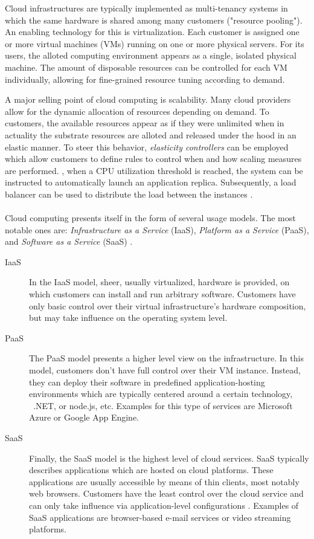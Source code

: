 Cloud infrastructures are typically implemented as multi-tenancy systems in which the same hardware is shared among many customers ("resource pooling"). An enabling technology for this is virtualization. Each customer is assigned one or more virtual machines (VMs) running on one or more physical servers. For its users, the alloted computing environment appears as a single, isolated physical machine. The amount of disposable resources can be controlled for each VM individually, allowing for fine-grained resource tuning according to demand.

A major selling point of cloud computing is scalability. Many cloud providers allow for the dynamic allocation of resources depending on demand. To customers, the available resources appear as if they were unlimited when in actuality the substrate resources are alloted and released under the hood in an elastic manner. To steer this behavior, \emph{elasticity controllers} can be employed which allow customers to define rules to control when and how scaling measures are performed. \Eg , when a CPU utilization threshold is reached, the system can be instructed to automatically launch an application replica. Subsequently, a load balancer can be used to distribute the load between the instances \cite{vaquero2011dynamically}.


\paragraph{}
Cloud computing presents itself in the form of several usage models. The most notable ones are: \emph{Infrastructure as a Service} (IaaS),  \emph{Platform as a Service} (PaaS),  and \emph{Software as a Service} (SaaS) \cite{mell2011nist}.

\begin{description}
\item[IaaS] In the IaaS model, sheer, usually virtualized, hardware is provided, on which customers can install and run arbitrary software. Customers have only basic control over their virtual infrastructure's hardware composition, but may take influence on the operating system level.
\item[PaaS] The PaaS model presents a higher level view on the infrastructure. In this model, customers don't have full control over their VM instance. Instead, they can deploy their software in predefined application-hosting environments \cite{mell2011nist} which are typically centered around a certain technology, \eg\ .NET, or node.js, etc. Examples for this type of services are Microsoft Azure or Google App Engine.
\item[SaaS] Finally, the SaaS model is the highest level of cloud services. SaaS typically describes applications which are hosted on cloud platforms. These applications are usually accessible by means of thin clients, most notably web browsers. Customers have the least control over the cloud service and can only take influence via application-level configurations \cite{mell2011nist}. Examples of SaaS applications are browser-based e-mail services or video streaming platforms.
\end{description}


